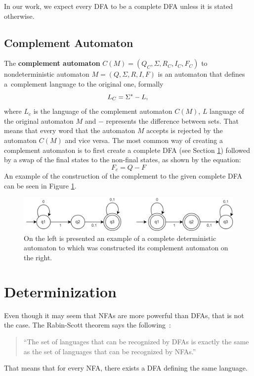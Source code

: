 In our work, we expect every DFA to be a complete DFA unless it is stated otherwise.

\subsection*{Complement Automaton}
The \textbf{complement automaton} $C(M)=(Q_C, \Sigma, R_C, I_C, F_C)$ to nondeterministic automaton $M=(Q, \Sigma, R, I, F)$ is an automaton that defines a~complement language to the original one, formally
\begin{equation*}
    L_C=\Sigma^*-L,\\
\end{equation*}
where $L_c$ is the language of the complement automaton $C(M)$, $L$ language of the original automaton $M$ and $-$ represents the difference between sets. That means that every word that the automaton $M$ accepts is rejected by the automaton $C(M)$ and vice versa.
The most common way of creating a complement automaton is to first create a complete DFA (see Section \ref{ssec:num2.4}) followed by a swap of the final states to the non-final states, as shown by the equation:
\begin{equation*}
    F_c = Q-F
\end{equation*}
An example of the construction of the complement to the given complete DFA can be seen in Figure \ref{compl-rev}.

\begin{figure}[ht]
    \label{compl-rev}
    \centering
    \includegraphics[width=0.9\linewidth]{obrazky-figures/complement.drawio.png}
    \caption{On the left is presented an example of a complete deterministic automaton to which was constructed its complement automaton on the right.}
\end{figure}
\vspace{0.3cm}


\section{Determinization}
\label{ssec:num2.4}
Even though it may seem that NFAs are more powerful than DFAs, that is not the case. The Rabin-Scott theorem says the following~\cite{ Blais2021, Kline2004}:
\begin{quote}
    ``The set of languages that can be recognized by DFAs is exactly the same as the set of languages that can be recognized by NFAs.''
\end{quote}
That means that for every NFA, there exists a DFA defining the same language.

